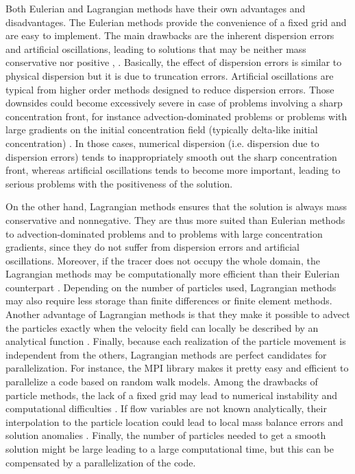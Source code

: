 Both Eulerian and Lagrangian methods have their own advantages and disadvantages. The Eulerian methods provide the convenience of a fixed grid and are easy to implement. The main drawbacks are the inherent dispersion errors and artificial oscillations, leading to solutions that may be neither mass conservative nor positive \cite{stijn1987positive}, \cite{yang1998accuracy}. Basically, the effect of dispersion errors is similar to physical dispersion but it is due to truncation errors. Artificial oscillations are typical from higher order methods designed to reduce dispersion errors. Those downsides could become excessively severe in case of problems involving a sharp concentration front, for instance advection-dominated problems or problems with large gradients on the initial concentration field (typically delta-like initial concentration) \cite{zheng2002applied}. In those cases, numerical dispersion (i.e. dispersion due to dispersion errors) tends to inappropriately smooth out the sharp concentration front, whereas artificial oscillations tends to become more important, leading to serious problems with the positiveness of the solution. 

On the other hand, Lagrangian methods ensures that the solution is always mass conservative and nonnegative. They are thus more suited than Eulerian methods to advection-dominated problems and to problems with large concentration gradients, since they do not suffer from dispersion errors and artificial oscillations. Moreover, if the tracer does not occupy the whole domain, the Lagrangian methods may be computationally more efficient than their Eulerian counterpart \cite{hunter1987application}. Depending on the number of particles used, Lagrangian methods may also require less storage than finite differences or finite element methods. Another advantage of Lagrangian methods is that they make it possible to advect the particles exactly when  the velocity field can locally be described by an analytical function \cite{hunter1993use}. Finally, because each realization of the particle movement is independent from the others, Lagrangian methods are perfect candidates for parallelization. For instance, the MPI library makes it pretty easy and efficient to parallelize a code based on random walk models. Among the drawbacks of particle methods, the lack of a fixed grid may lead to numerical instability and computational difficulties \cite{yeh1990lagrangian}. If flow variables are not known analytically, their interpolation to the particle location could lead to local mass balance errors and solution anomalies \cite{labolle1996random}. Finally, the number of particles needed to get a smooth solution might be large leading to a large computational time, but this can be compensated by a parallelization of the code.

